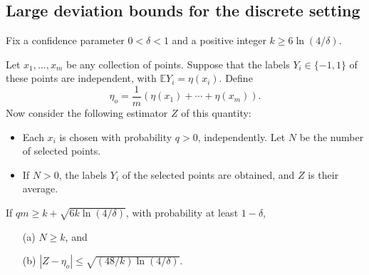 \documentclass[anon,12pt]{colt2022} %
\def\E{{\mathbb E}}
\begin{document}
\subsection{Large deviation bounds for the discrete setting}

\begin{lemma}
Fix a confidence parameter $0 < \delta < 1$ and a positive integer $k \geq 6 \ln (4/\delta)$. 

Let $x_1, \ldots, x_m$ be any collection of points. Suppose that the labels $Y_i \in \{-1,1\}$ of these points are independent, with $\E Y_i = \eta(x_i)$. Define
$$ \eta_o = \frac{1}{m} \left( \eta(x_1) + \cdots + \eta(x_m) \right) .$$
Now consider the following estimator $Z$ of this quantity:
\begin{itemize}
\item Each $x_i$ is chosen with probability $q > 0$, independently. Let $N$ be the number of selected points.
\item If $N > 0$, the labels $Y_i$ of the selected points are obtained, and $Z$ is their average.
\end{itemize}
If $qm \geq k + \sqrt{6k \ln (4/\delta)}$, with probability at least $1-\delta$, 
\begin{enumerate}
\item[(a)] $N \geq k$, and 
\item[(b)] $| Z - \eta_o| \leq \sqrt{(48/k) \ln (4/\delta)}$.
\end{enumerate}
\label{lemma:large-deviation-discrete}
\end{lemma}
\end{document}
